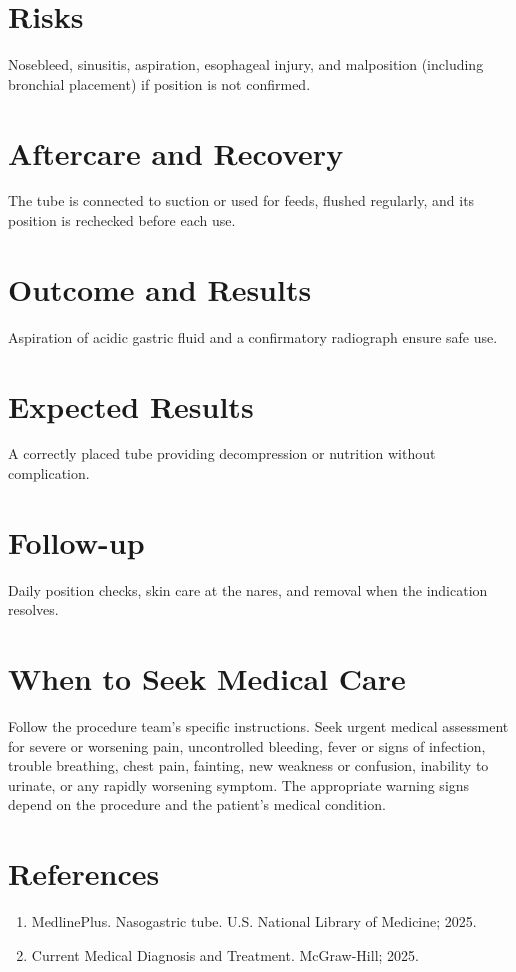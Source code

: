 \section*{Risks}
Nosebleed, sinusitis, aspiration, esophageal injury, and malposition (including bronchial placement) if position is not confirmed.

\section*{Aftercare and Recovery}
The tube is connected to suction or used for feeds, flushed regularly, and its position is rechecked before each use.

\section*{Outcome and Results}
Aspiration of acidic gastric fluid and a confirmatory radiograph ensure safe use.

\section*{Expected Results}
A correctly placed tube providing decompression or nutrition without complication.

\section*{Follow-up}
Daily position checks, skin care at the nares, and removal when the indication resolves.

\section*{When to Seek Medical Care}
Follow the procedure team's specific instructions. Seek urgent medical assessment for severe or worsening pain, uncontrolled bleeding, fever or signs of infection, trouble breathing, chest pain, fainting, new weakness or confusion, inability to urinate, or any rapidly worsening symptom. The appropriate warning signs depend on the procedure and the patient's medical condition.

\section*{References}
\begin{enumerate}
  \item MedlinePlus. Nasogastric tube. U.S. National Library of Medicine; 2025.
  \item Current Medical Diagnosis and Treatment. McGraw-Hill; 2025.
\end{enumerate}

\clearpage
